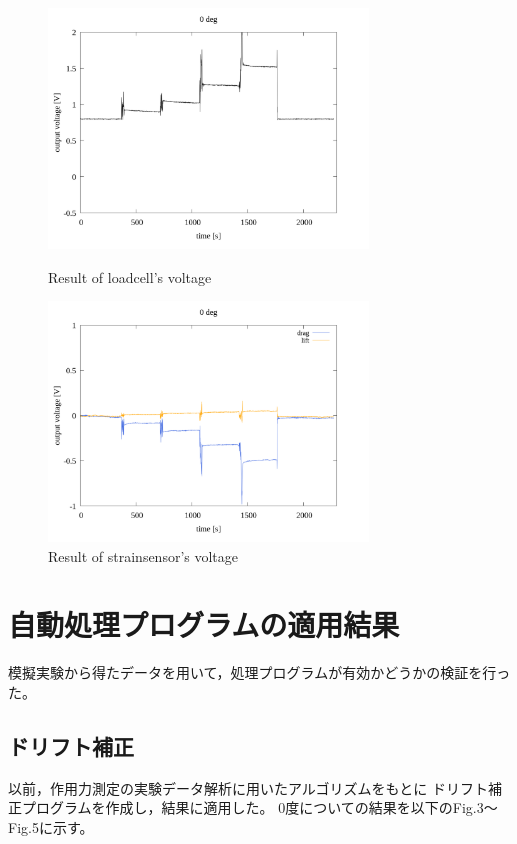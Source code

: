 \documentclass[twocolumn,a4j]{jsarticle}
\begin{document}
\begin{figure}[htbp]
    \footnotesize
    \begin{center}
        \includegraphics[width=85mm]{../images/0_loadcell.png}
        \caption{Result of loadcell's voltage}
        \includegraphics[width=85mm]{../images/0_strainsensor.png}
        \caption{Result of strainsensor's voltage}
    \end{center}
\end{figure}

\section{自動処理プログラムの適用結果}
模擬実験から得たデータを用いて，処理プログラムが有効かどうかの検証を行った。
\subsection{ドリフト補正}
以前，作用力測定の実験データ解析に用いたアルゴリズムをもとに
ドリフト補正プログラムを作成し，結果に適用した。
0度についての結果を以下のFig.3～Fig.5に示す。
\end{document}
